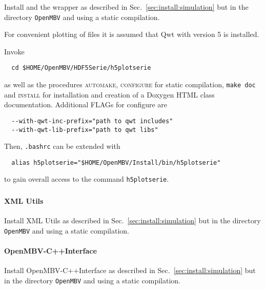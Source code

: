 \subsubsection{\HDF}
Install \HDF{} and the \HDF{} wrapper as described in Sec.~\ref{sec:install:simulation} but in the directory \texttt{OpenMBV} and using a static compilation.\par
For convenient plotting of \HDF{} files it is assumed that Qwt with version 5 is installed.\par
Invoke 
\begin{verbatim}
  cd $HOME/OpenMBV/HDF5Serie/h5plotserie
\end{verbatim}
as well as the procedures \textsc{automake, configure} for static compilation, \texttt{make doc} and \textsc{install} for installation and creation of a Doxygen HTML class documentation. Additional FLAGs for configure are
\begin{verbatim}
  --with-qwt-inc-prefix="path to qwt includes"
  --with-qwt-lib-prefix="path to qwt libs"
\end{verbatim}
Then, \texttt{.bashrc} can be extended with
\begin{verbatim}
  alias h5plotserie="$HOME/OpenMBV/Install/bin/h5plotserie"
\end{verbatim}
to gain overall access to the command \texttt{h5plotserie}.

\subsubsection{\OpenMBV{}}
\paragraph{XML Utils}
Install XML Utils as described in Sec.~\ref{sec:install:simulation} but in the directory \texttt{OpenMBV} and using a static compilation.

\paragraph{OpenMBV-C++Interface}
Install OpenMBV-C++Interface as described in Sec.~\ref{sec:install:simulation} but in the directory \texttt{OpenMBV} and using a static compilation.

